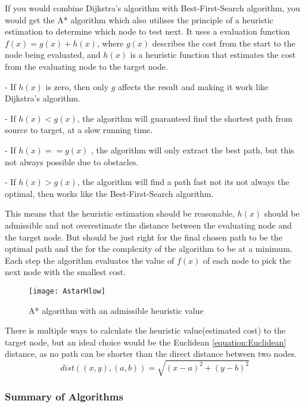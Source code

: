   If you would combine Dijkstra's algorithm with Best-First-Search algorithm, you would get the A* algorithm which also utilises the principle of a heuristic estimation to determine which node to test next. It uses a evaluation function $f(x) = g(x) + h(x)$, where $g(x)$ describes the cost from the start to the node being evaluated, and $h(x)$ is a heuristic function that estimates the cost from the evaluating node to the target node. \cite{http://theory.stanford.edu/}

  - If $h(x)$ is zero, then only $g$ affects the result and making it work like Dijkstra's algorithm.

  - If $h(x) < g(x)$, the algorithm will guaranteed find the shortest path from source to target, at a slow running time.

  - If $h(x) == g(x)$ , the algorithm will only extract the best path, but this not always possible due to obstacles.

  - If $h(x) > g(x)$, the algorithm will find a path fast not its not always the optimal, then works like the Best-First-Search algorithm.

  This means that the heuristic estimation should be reasonable, $h(x)$ should be admissible and not overestimate the distance between the evaluating node and the target node. But should be just right for the final chosen path to be the optimal path and the for the complexity of the algorithm to be at a minimum. Each step the algorithm evaluates the value of $f(x)$ of each node to pick the next node with the smallest cost.

  \begin{figure}[ht!]
    \centering
    \texttt{[image: AstarHlow]}
    \caption{A* algorithm with an admissible heuristic value}
    \label{astar}
  \end{figure}

  There is multiple ways to calculate the heuristic value(estimated cost) to the target node, but an ideal choice would be the Euclidean \ref{equation:Euclidean}  distance, as no path can be shorter than the direct distance between two nodes.
  \begin{equation} \label{equation:Euclidean}
    dist((x, y), (a, b)) = \sqrt{(x - a)^2 + (y - b)^2}
  \end{equation}

  \subsubsection{Summary of Algorithms}

